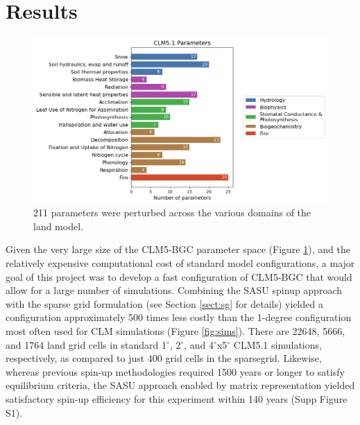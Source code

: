 \documentclass[draft]{agujournal2019}
\begin{document}
\section{Results}
\begin{figure}[h]
\centering
\includegraphics[width=\textwidth]{../figs/main/bar.png}
\caption{211 parameters were perturbed across the various domains of the land model.}
\label{fig:params}
\end{figure}
Given the very large size of the CLM5-BGC parameter space (Figure \ref{fig:params}), and the relatively expensive computational cost of standard model configurations, a major goal of this project was to develop a fast configuration of CLM5-BGC that would allow for a large number of simulations. Combining the SASU spinup approach with the sparse grid formulation (see Section \ref{sect:sg} for details) yielded a configuration approximately 500 times less costly than the 1-degree configuration most often used for CLM simulations (Figure \ref{fig:sims}). There are 22648, 5666, and 1764 land grid cells in standard 1$^{\circ}$, 2$^{\circ}$, and 4$^{\circ}$x5$^{\circ}$ CLM5.1 simulations, respectively, as compared to just 400 grid cells in the sparsegrid. Likewise, whereas previous spin-up methodologies required 1500 years or longer to satisfy equilibrium criteria, the SASU approach enabled by matrix representation yielded satisfactory spin-up efficiency for this experiment within 140 years (Supp Figure S1).
\end{document}
